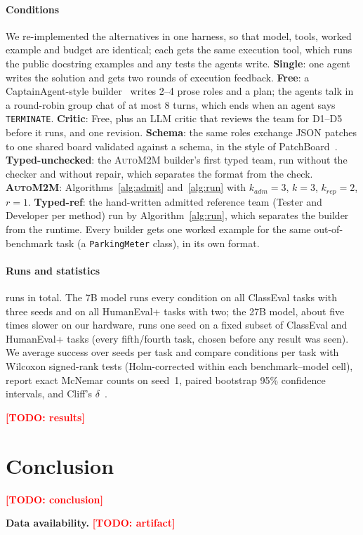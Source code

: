 \documentclass[10pt,conference]{IEEEtran}
\theoremstyle{definition}
\newcommand{\auto}{\textsc{AutoM2M}}
\newcommand{\D}[1]{\textsf{D#1}}
\newcommand{\code}[1]{\texttt{#1}}
\newcommand{\todo}[1]{\textcolor{red}{\textbf{[TODO: #1]}}}
\begin{document}
\paragraph*{Conditions} We re-implemented the alternatives in one harness, so
that model, tools, worked example and budget are identical; each gets the
same execution tool, which runs the public docstring examples and any tests
the agents write. \textbf{Single}: one agent writes the solution and gets two
rounds of execution feedback. \textbf{Free}: a CaptainAgent-style
builder~\cite{song2024captain} writes 2--4 prose roles and a plan; the agents
talk in a round-robin group chat of at most 8 turns, which ends when an agent
says \code{TERMINATE}. \textbf{Critic}: Free, plus an LLM critic that reviews
the team for \D1--\D5 before it runs, and one revision. \textbf{Schema}: the
same roles exchange JSON patches to one shared board validated against a
schema, in the style of PatchBoard~\cite{zhang2026patchboard}.
\textbf{Typed-unchecked}: the \auto{} builder's first typed team, run
without the checker and without repair, which separates the format from the
check. \textbf{\auto{}}: Algorithms~\ref{alg:admit} and~\ref{alg:run} with
$k_{\mathit{adm}}=3$, $k=3$, $k_{\mathit{rep}}=2$, $r=1$.
\textbf{Typed-ref}: the hand-written admitted reference team (Tester and
Developer per method) run by Algorithm~\ref{alg:run}, which separates the
builder from the runtime. Every builder gets one worked example for the same
out-of-benchmark task (a \code{ParkingMeter} class), in its own format.

\paragraph*{Runs and statistics} \nRunsTotal{} runs in total. The 7B model runs
every condition on all ClassEval tasks with three seeds and on all
HumanEval+ tasks with two; the 27B model, about five times slower on our
hardware, runs one seed on a fixed subset of \nCESubset{} ClassEval and
\nHESubset{} HumanEval+ tasks (every fifth/fourth task, chosen before any
result was seen). We average success over seeds per task and compare
conditions per task with Wilcoxon signed-rank tests (Holm-corrected within
each benchmark--model cell), report exact McNemar counts on seed~1, paired
bootstrap 95\% confidence intervals, and Cliff's
$\delta$~\cite{arcuri2014guide}.

\todo{results}

\section{Conclusion}\label{sec:conclusion}
\todo{conclusion}

\noindent\textbf{Data availability.}\label{sec:data} \todo{artifact}



\end{document}

